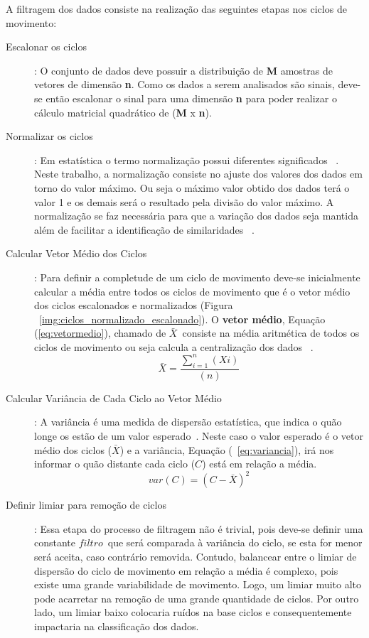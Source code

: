 A filtragem dos dados consiste na realização das seguintes etapas nos ciclos de movimento:
\begin{description}
	\item [Escalonar os ciclos]: O conjunto de dados deve possuir a distribuição de \textbf{M} amostras de vetores de dimensão \textbf{n}. Como os dados a serem analisados são sinais, deve-se então escalonar o sinal para uma dimensão \textbf{n} para poder realizar o cálculo matricial quadrático de (\textbf{M} x \textbf{n}).		
	\item [Normalizar os ciclos]: Em estatística o termo normalização possui diferentes significados ~\cite{statisticterms2006}. Neste trabalho, a normalização consiste no ajuste dos valores dos dados em torno do valor máximo. Ou seja o máximo valor obtido dos dados terá o valor 1 e os demais será o resultado pela divisão do valor máximo. A normalização se faz necessária para que a variação dos dados seja mantida além de facilitar a identificação de similaridades ~\cite{vicini2005}. 	
	\item [Calcular Vetor Médio dos Ciclos]: Para definir a completude de um ciclo de movimento deve-se inicialmente calcular a média entre todos os ciclos de movimento que é o vetor médio dos ciclos escalonados e normalizados (Figura ~\ref{img:ciclos_normalizado_escalonado}). O \textbf{vetor médio}, Equação (\ref{eq:vetormedio}), chamado de $\bar{X}$\ consiste na média aritmética de todos os ciclos de movimento ou seja calcula a centralização dos dados ~\cite{statisticshandbook2009}. 	
		\begin{equation}
			\bar{X}=\frac{\sum_{i=1}^{n}(Xi)}{(n)}
			\label{eq:vetormedio}
		\end{equation}
	\item [Calcular Variância de Cada Ciclo ao Vetor Médio]: A variância é uma medida de dispersão estatística, que indica o quão longe os estão de um valor esperado~\cite{statisticshandbook2009}. Neste caso o  valor esperado é o vetor médio dos ciclos ($\bar{X}$) e a variância, Equação (~\ref{eq:variancia}), irá nos informar o quão distante cada ciclo ($C$) está em relação a média.
		\begin{equation}
			var(C) = (C - \bar{X} )^2
			\label{eq:variancia}
		\end{equation}
		
		
	\item [Definir limiar para remoção de ciclos]: Essa etapa do processo de filtragem não é trivial, pois deve-se definir uma constante $ filtro $\ que será comparada à variância do ciclo, se esta for menor será aceita, caso contrário removida. Contudo, balancear entre o limiar de dispersão do ciclo de movimento em relação a média é complexo, pois existe uma grande variabilidade de movimento. Logo, um limiar muito alto pode acarretar na remoção de uma grande quantidade de ciclos. Por outro lado, um limiar baixo colocaria ruídos na base ciclos e consequentemente impactaria na classificação dos dados.	
	\lstset{language=Matlab}
	\begin{lstlisting}[frame=single, caption=Filtro dos Ciclos]  % Start your code-block
		

\end{lstlisting}
\end{description}
